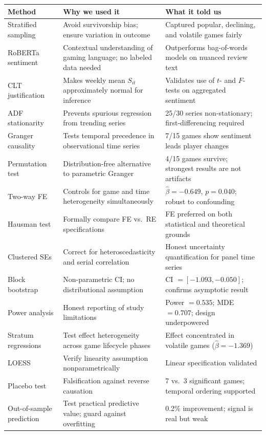 \documentclass[11pt, letterpaper]{article}
\theoremstyle{definition}
\begin{document}
\begin{center}
\renewcommand{\arraystretch}{1.35}
\small
\begin{tabular}{p{3.8cm} p{4.2cm} p{5.5cm}}
\toprule
\textbf{Method} & \textbf{Why we used it} & \textbf{What it told us} \\
\midrule
Stratified sampling & Avoid survivorship bias; ensure variation in outcome & Captured popular, declining, and volatile games fairly \\
\midrule
RoBERTa sentiment & Contextual understanding of gaming language; no labeled data needed & Outperforms bag-of-words models on nuanced review text \\
\midrule
CLT justification & Makes weekly mean $S_{it}$ approximately normal for inference & Validates use of $t$- and $F$-tests on aggregated sentiment \\
\midrule
ADF stationarity & Prevents spurious regression from trending series & 25/30 series non-stationary; first-differencing required \\
\midrule
Granger causality & Tests temporal precedence in observational time series & 7/15 games show sentiment leads player changes \\
\midrule
Permutation test & Distribution-free alternative to parametric Granger & 4/15 games survive; strongest results are not artifacts \\
\midrule
Two-way FE & Controls for game and time heterogeneity simultaneously & $\hat{\beta} = -0.649$, $p = 0.040$; robust to confounding \\
\midrule
Hausman test & Formally compare FE vs.\ RE specifications & FE preferred on both statistical and theoretical grounds \\
\midrule
Clustered SEs & Correct for heteroscedasticity and serial correlation & Honest uncertainty quantification for panel time series \\
\midrule
Block bootstrap & Non-parametric CI; no distributional assumption & CI $= [-1.093, -0.050]$; confirms asymptotic result \\
\midrule
Power analysis & Honest reporting of study limitations & Power $= 0.535$; MDE $= 0.707$; design underpowered \\
\midrule
Stratum regressions & Test effect heterogeneity across game lifecycle phases & Effect concentrated in volatile games ($\hat{\beta} = -1.369$) \\
\midrule
LOESS & Verify linearity assumption nonparametrically & Linear specification validated \\
\midrule
Placebo test & Falsification against reverse causation & 7 vs.\ 3 significant games; temporal ordering supported \\
\midrule
Out-of-sample prediction & Test practical predictive value; guard against overfitting & 0.2\% improvement; signal is real but weak \\
\bottomrule
\end{tabular}
\end{center}
\end{document}
